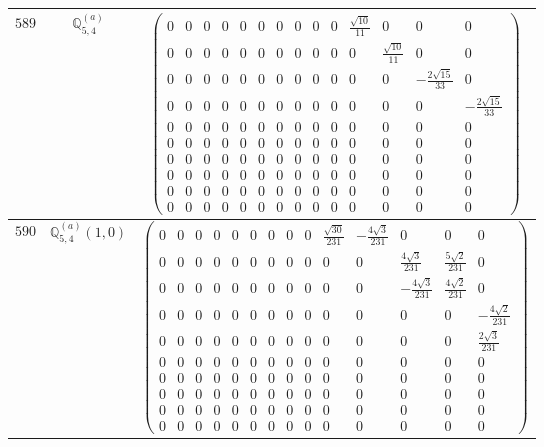 \documentclass[fleqn,8pt,landscape]{jsarticle}
\begin{document}
\begin{center}
\begin{longtable}{ccc}
$ 589 $ & $ \mathbb{Q}_{5,4}^{(a)} $ & $ \begin{pmatrix} 0 & 0 & 0 & 0 & 0 & 0 & 0 & 0 & 0 & 0 & \frac{\sqrt{10}}{11} & 0 & 0 & 0 \\ 0 & 0 & 0 & 0 & 0 & 0 & 0 & 0 & 0 & 0 & 0 & \frac{\sqrt{10}}{11} & 0 & 0 \\ 0 & 0 & 0 & 0 & 0 & 0 & 0 & 0 & 0 & 0 & 0 & 0 & - \frac{2 \sqrt{15}}{33} & 0 \\ 0 & 0 & 0 & 0 & 0 & 0 & 0 & 0 & 0 & 0 & 0 & 0 & 0 & - \frac{2 \sqrt{15}}{33} \\ 0 & 0 & 0 & 0 & 0 & 0 & 0 & 0 & 0 & 0 & 0 & 0 & 0 & 0 \\ 0 & 0 & 0 & 0 & 0 & 0 & 0 & 0 & 0 & 0 & 0 & 0 & 0 & 0 \\ 0 & 0 & 0 & 0 & 0 & 0 & 0 & 0 & 0 & 0 & 0 & 0 & 0 & 0 \\ 0 & 0 & 0 & 0 & 0 & 0 & 0 & 0 & 0 & 0 & 0 & 0 & 0 & 0 \\ 0 & 0 & 0 & 0 & 0 & 0 & 0 & 0 & 0 & 0 & 0 & 0 & 0 & 0 \\ 0 & 0 & 0 & 0 & 0 & 0 & 0 & 0 & 0 & 0 & 0 & 0 & 0 & 0 \end{pmatrix} $ \\ \hline
$ 590 $ & $ \mathbb{Q}_{5,4}^{(a)}(1,0) $ & $ \begin{pmatrix} 0 & 0 & 0 & 0 & 0 & 0 & 0 & 0 & 0 & \frac{\sqrt{30}}{231} & - \frac{4 \sqrt{3}}{231} & 0 & 0 & 0 \\ 0 & 0 & 0 & 0 & 0 & 0 & 0 & 0 & 0 & 0 & 0 & \frac{4 \sqrt{3}}{231} & \frac{5 \sqrt{2}}{231} & 0 \\ 0 & 0 & 0 & 0 & 0 & 0 & 0 & 0 & 0 & 0 & 0 & - \frac{4 \sqrt{3}}{231} & \frac{4 \sqrt{2}}{231} & 0 \\ 0 & 0 & 0 & 0 & 0 & 0 & 0 & 0 & 0 & 0 & 0 & 0 & 0 & - \frac{4 \sqrt{2}}{231} \\ 0 & 0 & 0 & 0 & 0 & 0 & 0 & 0 & 0 & 0 & 0 & 0 & 0 & \frac{2 \sqrt{3}}{231} \\ 0 & 0 & 0 & 0 & 0 & 0 & 0 & 0 & 0 & 0 & 0 & 0 & 0 & 0 \\ 0 & 0 & 0 & 0 & 0 & 0 & 0 & 0 & 0 & 0 & 0 & 0 & 0 & 0 \\ 0 & 0 & 0 & 0 & 0 & 0 & 0 & 0 & 0 & 0 & 0 & 0 & 0 & 0 \\ 0 & 0 & 0 & 0 & 0 & 0 & 0 & 0 & 0 & 0 & 0 & 0 & 0 & 0 \\ 0 & 0 & 0 & 0 & 0 & 0 & 0 & 0 & 0 & 0 & 0 & 0 & 0 & 0 \end{pmatrix} $ \\ \hline

\end{longtable}
\end{center}
\end{document}
